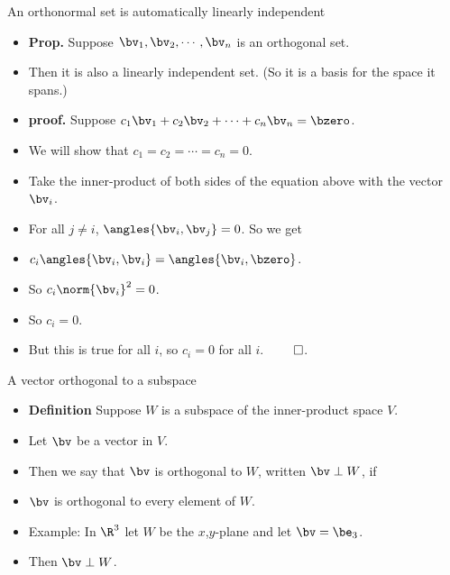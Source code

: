 \documentclass{beamer}
\begin{document}
\begin{frame}{An orthonormal set is automatically linearly independent}
\begin{itemize}
\item \textbf{Prop.} Suppose $\bv_1,\bv_2,\cdots,\bv_n$ is an orthogonal set.
\item Then it is also a linearly independent set. (So it is a basis for the space it spans.)
\item \textbf{proof.} Suppose $c_1\bv_1+c_2\bv_2+\cdots+c_n\bv_n=\bzero$.
\item We will show that $c_1=c_2=\cdots=c_n=0$.
\item Take the inner-product of both sides of the equation above with the vector $\bv_i$.
\item For all $j\not=i$, $\angles{\bv_i,\bv_j} = 0$. So we get
\item $c_i\angles{\bv_i,\bv_i} = \angles{\bv_i,\bzero}$.
\item So $c_i\norm{\bv_i}^2 = 0$.
\item So $c_i=0$.
\item But this is true for all $i$, so $c_i=0$ for all $i$. $\qed$.
\end{itemize}

\end{frame}
\begin{frame}{A vector orthogonal to a subspace}
\begin{itemize}
\item \textbf{Definition} Suppose $W$ is a subspace of the inner-product space $V$.
\item Let $\bv$ be a vector in $V$.
\item Then we say that $\bv$ is orthogonal to $W$, written $\bv\perp W$, if
\item $\bv$ is orthogonal to every element of $W$.
\item Example: In $\R^3$ let $W$ be the $x$,$y$-plane and let $\bv=\be_3$.
\item Then $\bv\perp W$.
\end{itemize}
\end{frame}
\end{document}
